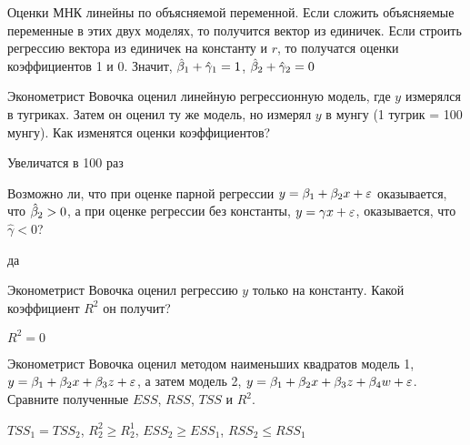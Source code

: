 \documentclass[pdftex,11pt,openany]{book}\usepackage[]{graphicx}\usepackage[]{color}
\begin{document}
\begin{solution}
 Оценки МНК линейны по объясняемой переменной. Если сложить объясняемые переменные в этих двух моделях, то получится вектор из единичек. Если строить регрессию вектора из единичек на константу и $r$, то получатся оценки коэффициентов 1 и 0. Значит, $\hat{\beta}_1+\hat{\gamma}_1=1$, $\hat{\beta}_2+\hat{\gamma}_2=0$ 
\end{solution}



\begin{problem}
 Эконометрист Вовочка оценил линейную регрессионную модель, где $y$ измерялся в тугриках. Затем он оценил ту же модель, но измерял $y$ в мунгу (1 тугрик = 100 мунгу). Как изменятся оценки коэффициентов?
\end{problem}

\begin{solution}
 Увеличатся в 100 раз
\end{solution}


\begin{problem}
 Возможно ли, что при оценке парной регрессии $y=\beta_1+\beta_2 x+\varepsilon$ оказывается, что $\hat{\beta}_2>0$, а при оценке регрессии без константы, $y=\gamma x+\varepsilon$, оказывается, что $\hat{\gamma}<0$?
\end{problem}

\begin{solution}
 да
\end{solution}



\begin{problem}
 Эконометрист Вовочка оценил регрессию $y$ только на константу. Какой коэффициент $R^2$ он получит?
\end{problem}

\begin{solution}
$R^2=0$
\end{solution}



\begin{problem}
 Эконометрист Вовочка оценил методом наименьших квадратов модель 1, $y=\beta_1+\beta_2 x+\beta_3 z+\varepsilon$, а затем модель 2, $y=\beta_1+\beta_2 x+\beta_3 z+\beta_4 w+\varepsilon$. Сравните полученные $ESS$, $RSS$, $TSS$ и $R^2$.
\end{problem}

\begin{solution}
 $TSS_1=TSS_2$, $R_2^2\geq R_2^1$, $ESS_2\geq ESS_1$, $RSS_2\leq RSS_1$
\end{solution}
\end{document}
